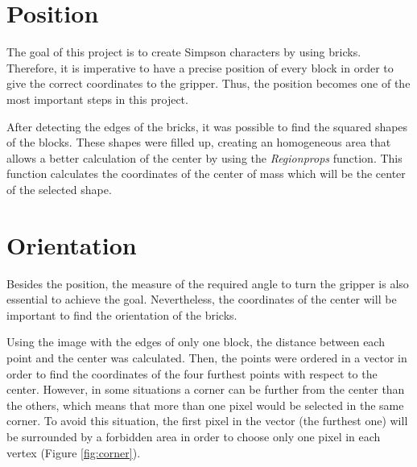 \section{Position}
The goal of this project is to create Simpson characters by using bricks. Therefore, it is imperative to have a precise position of every block in order to give the correct coordinates to the gripper. Thus, the position becomes one of the most important steps in this project.

After detecting the edges of the bricks, it was possible to find the squared shapes of the blocks. These shapes were filled up, creating an homogeneous area that allows a better calculation of the center by using the \textit{Regionprops} function. This function calculates the coordinates of the center of mass which will be the center of the selected shape.

\section{Orientation}
Besides the position, the measure of the required angle to turn the gripper is also essential to achieve the goal. Nevertheless, the coordinates of the center will be important to find the orientation of the bricks. 

Using the image with the edges of only one block, the distance between each point and the center was calculated. Then, the points were ordered in a vector in order to find the coordinates of the four furthest points with respect to the center. However, in some situations a corner can be further from the center than the others, which means that more than one pixel would be selected in the same corner. To avoid this situation, the first pixel in the vector (the furthest one) will be surrounded by a forbidden area in order to choose only one pixel in each vertex (Figure \ref{fig:corner}).

